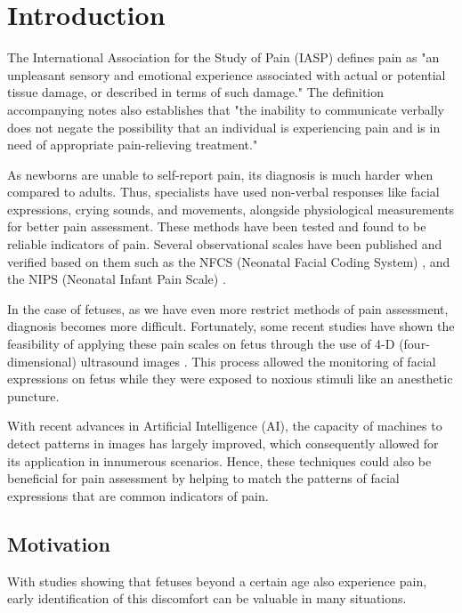 \chapter{Introduction}

The International Association for the Study of Pain (IASP) defines pain as "an unpleasant sensory and emotional experience associated with actual or potential tissue damage, or described in terms of such damage." \citep{merskey1994classification} The definition accompanying notes also establishes that "the inability to communicate verbally does not negate the possibility that an individual is experiencing pain and is in need of appropriate pain-relieving treatment."

As newborns are unable to self-report pain, its diagnosis is much harder when compared to adults. Thus, specialists have used non-verbal responses like facial expressions, crying sounds, and movements, alongside physiological measurements for better pain assessment. These methods have been tested and found to be reliable indicators of pain. Several observational scales have been published and verified based on them such as the NFCS (Neonatal Facial Coding System) \citep{Grunau1998}, and the NIPS (Neonatal Infant Pain Scale) \citep{HudsonBarr2002}.

In the case of fetuses, as we have even more restrict methods of pain assessment, diagnosis becomes more difficult. Fortunately, some recent studies have shown the feasibility of applying these pain scales on fetus through the use of 4-D (four-dimensional) ultrasound images \citep{bernardes2018feasibility}. This process allowed the monitoring of facial expressions on fetus while they were exposed to noxious stimuli like an anesthetic puncture.

With recent advances in Artificial Intelligence (AI), the capacity of machines to detect patterns in images has largely improved, which consequently allowed for its application in innumerous scenarios. Hence, these techniques could also be beneficial for pain assessment by helping to match the patterns of facial expressions that are common indicators of pain.

\section{Motivation}

With studies showing that fetuses beyond a certain age also experience pain, early identification of this discomfort can be valuable in many situations.

